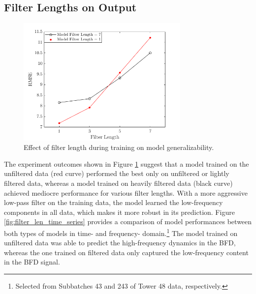 \subsection{Filter Lengths on Output}




\begin{figure}[h!]
    \centering
    \includegraphics[width=0.75\textwidth]{figures/filter_length.png}
    \caption{Effect of filter length during training on model generalizability.}
    \label{fig:filter_len}
\end{figure}

The experiment outcomes shown in Figure \ref{fig:filter_len} suggest that a model trained on the unfiltered data (red curve) performed the best only on unfiltered or lightly filtered data, whereas a model trained on heavily filtered data (black curve) achieved mediocre performance for various filter lengths. With a more aggressive low-pass filter on the training data, the model learned the low-frequency components in all data, which makes it more robust in its prediction. Figure \ref{fig:filter_len_time_series} provides a comparison of model performances between both types of models in time- and frequency- domain.\footnote{Selected from Subbatches 43 and 243 of Tower 48 data, respectively.} The model trained on unfiltered data was able to predict the high-frequency dynamics in the BFD, whereas the one trained on filtered data only captured the low-frequency content in the BFD signal. 

